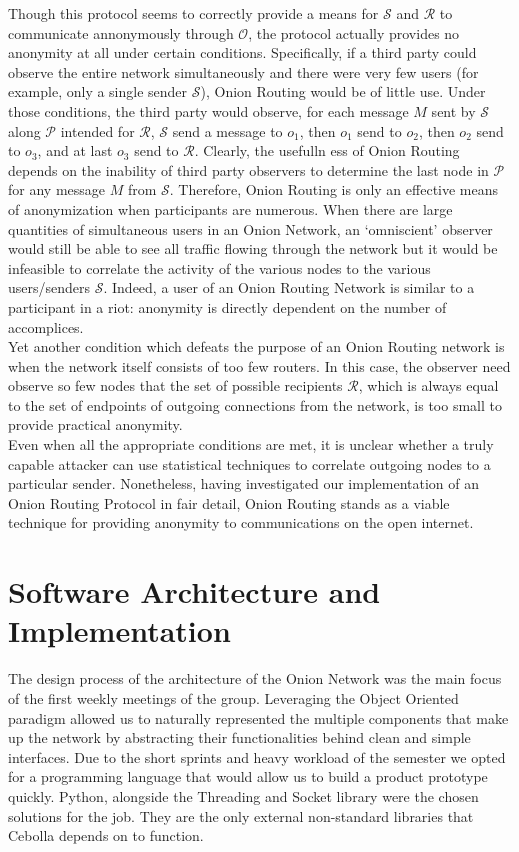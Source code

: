 \documentclass[10pt]{report}
\begin{document}
Though this protocol seems to correctly provide a means for $\mathcal{S}$ and $\mathcal{R}$ to communicate
annonymously through $\mathcal{O}$, the protocol actually provides no anonymity at all under certain conditions.
Specifically, if a third party could observe the entire network simultaneously and there were very few users
(for example, only a single sender $\mathcal{S}$), Onion Routing would be of little use.  Under those conditions,
the third party would observe, for each message $M$ sent by $\mathcal{S}$ along $\mathcal{P}$ intended for
$\mathcal{R}$, $\mathcal{S}$ send a message to $o_1$, then $o_1$ send to $o_2$, then $o_2$ send to $o_3$, and
at last $o_3$ send to $\mathcal{R}$.  Clearly, the usefulln
ess of Onion Routing depends on the inability of
third party observers to determine the last node in $\mathcal{P}$ for any message $M$ from $\mathcal{S}$.
Therefore, Onion Routing is only an effective means of anonymization when participants are numerous.
When there are
large quantities of simultaneous users in an Onion Network, an `omniscient' observer would still be able
to see all traffic flowing through the network but it would be infeasible to correlate the activity of the
various nodes to the various users/senders $\mathcal{S}$.  Indeed, a user of an Onion Routing Network is similar
to a participant in a riot: anonymity is directly dependent on the number of accomplices.\\

Yet another condition which defeats the purpose of an Onion Routing network is when the network itself consists
of too few routers.  In this case, the observer need observe so few nodes that the set of possible recipients
$\mathcal{R}$, which is always equal to the set of endpoints of outgoing connections from the network, is too
small to provide practical anonymity.\\

Even when all the appropriate conditions are met, it is unclear whether a truly capable attacker can use
statistical techniques to correlate outgoing nodes to a particular sender.  Nonetheless, having investigated
our implementation of an Onion Routing Protocol in fair detail, Onion Routing stands as a viable technique for
providing anonymity to communications on the open internet.

\section{Software Architecture and Implementation}
The design process of the architecture of the Onion Network was the main focus of the first weekly meetings of the group. Leveraging the Object Oriented paradigm allowed us to naturally represented the multiple components that make up the network by abstracting their functionalities behind clean and simple interfaces. Due to the short sprints and heavy workload of the semester we opted for a programming language that would allow us to build a product prototype quickly. Python, alongside the Threading and Socket library were the chosen solutions for the job. They are the only external non-standard libraries that Cebolla depends on to function. \\
\end{document}
